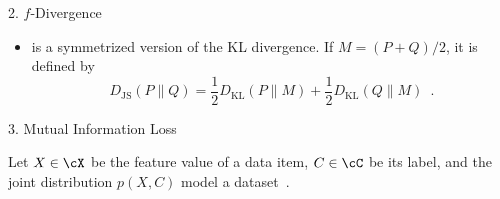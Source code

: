 \documentclass[final]{beamer}
\newcommand{\kl}[2]{D_{\mathrm{KL}}( #1 \parallel #2 )}
\newcommand{\js}[2]{D_{\mathrm{JS}}( #1 \parallel #2 )}
\newlength{\onecolwid}
\begin{document}
\begin{frame}[t]
\begin{columns}[t]
\begin{column}{\onecolwid}
\begin{block}{2. $ f $-Divergence}
\begin{itemize}
		\item {}
			 is a symmetrized version 
			of the 
			KL divergence. If 
			 $ M=(P+Q)/2 $, it 
			is defined by
			\begin{equation}\label{eq:jensen-shannon}
			\js{P}{Q} = \frac{1}{2} \kl{P}{M} + \frac{1}{2} \kl{Q}{M}\enspace.
			\end{equation}
\end{itemize}
	\end{block}
	\begin{block}{3. Mutual Information Loss}
		
		Let $ X\in \cX $ be the feature value of a data item, $ C\in \cC $ be 
		its 
		label, and the joint distribution $ p(X,C) $ model a 
		dataset~\citep{bateni2019categorical}.
		

\end{block}
\end{column}
\end{columns}
\end{frame}
\end{document}
